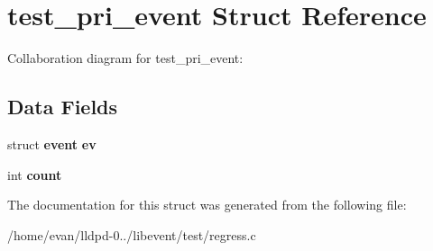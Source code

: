\section{test\-\_\-pri\-\_\-event \-Struct \-Reference}
\label{structtest__pri__event}


\-Collaboration diagram for test\-\_\-pri\-\_\-event\-:
\subsection*{\-Data \-Fields}
\begin{DoxyCompactItemize}
\item 
struct {\bf event} {\bfseries ev}\label{structtest__pri__event_ace3e34472d1f55b6a831df15ff5e2d9c}

\item 
int {\bfseries count}\label{structtest__pri__event_ad43c3812e6d13e0518d9f8b8f463ffcf}

\end{DoxyCompactItemize}


\-The documentation for this struct was generated from the following file\-:\begin{DoxyCompactItemize}
\item 
/home/evan/lldpd-\/0../libevent/test/regress.\-c\end{DoxyCompactItemize}
